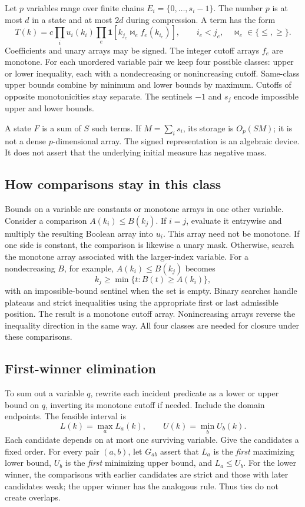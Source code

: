 \documentclass[12pt,a4paper]{article}
\theoremstyle{definition}
\newcommand{\ind}{\mathbf 1}
\begin{document}
Let $p$ variables range over finite chains $E_i=\{0,\ldots,s_i-1\}$.
The number $p$ is at most $d$ in a state and at most $2d$ during compression.
A term has the form
\begin{equation}
 T(k)=c\prod_i u_i(k_i)
           \prod_e\ind[k_{j_e}\mathrel{\bowtie_e} f_e(k_{i_e})],
 \qquad i_e<j_e,\quad \bowtie_e\in\{\le,\ge\}.
 \label{eq:term}
\end{equation}
Coefficients and unary arrays may be signed. The integer cutoff arrays
$f_e$ are monotone. For each unordered variable pair we keep four possible
classes: upper or lower inequality, each with a nondecreasing or
nonincreasing cutoff. Same-class upper bounds combine by minimum and
lower bounds by maximum. Cutoffs of opposite monotonicities stay separate.
The sentinels $-1$ and $s_j$ encode impossible upper and lower bounds.

A state $F$ is a sum of $S$ such terms. If $M=\sum_i s_i$, its storage
is $O_p(SM)$; it is not a dense $p$-dimensional array. The signed
representation is an algebraic device. It does not assert that the
underlying initial measure has negative mass.

\subsection{How comparisons stay in this class}
Bounds on a variable are constants or monotone arrays in one other
variable. Consider a comparison $A(k_i)\le B(k_j)$.
If $i=j$, evaluate it entrywise and multiply the resulting Boolean array
into $u_i$. This array need not be monotone. If one side is constant,
the comparison is likewise a unary mask. Otherwise, search the monotone
array associated with the larger-index variable. For a nondecreasing
$B$, for example, $A(k_i)\le B(k_j)$ becomes
\[
 k_j\ge \min\{t:B(t)\ge A(k_i)\},
\]
with an impossible-bound sentinel when the set is empty. Binary searches
handle plateaus and strict inequalities using the appropriate first or
last admissible position. The result is a monotone cutoff array.
Nonincreasing arrays reverse the inequality direction in the same way.
All four classes are needed for closure under these comparisons.

\subsection{First-winner elimination}
To sum out a variable $q$, rewrite each incident predicate as a lower or
upper bound on $q$, inverting its monotone cutoff if needed. Include the
domain endpoints. The feasible interval is
\[
 L(k)=\max_a L_a(k),\qquad U(k)=\min_b U_b(k).
\]
Each candidate depends on at most one surviving variable. Give the
candidates a fixed order. For every pair $(a,b)$, let $G_{ab}$ assert
that $L_a$ is the \emph{first} maximizing lower bound, $U_b$ is the
\emph{first} minimizing upper bound, and $L_a\le U_b$.
For the lower winner, the comparisons with earlier candidates are
strict and those with later candidates weak; the upper winner has the
analogous rule. Thus ties do not create overlaps.
\end{document}
